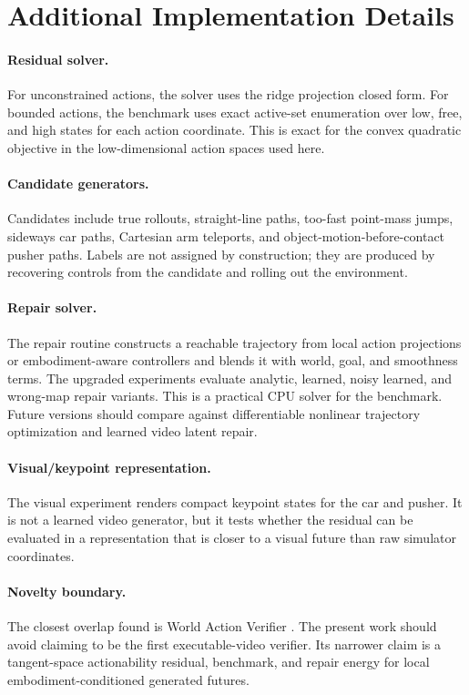 \section{Additional Implementation Details}

\paragraph{Residual solver.}
For unconstrained actions, the solver uses the ridge projection closed form. For bounded actions, the benchmark uses exact active-set enumeration over low, free, and high states for each action coordinate. This is exact for the convex quadratic objective in the low-dimensional action spaces used here.

\paragraph{Candidate generators.}
Candidates include true rollouts, straight-line paths, too-fast point-mass jumps, sideways car paths, Cartesian arm teleports, and object-motion-before-contact pusher paths. Labels are not assigned by construction; they are produced by recovering controls from the candidate and rolling out the environment.

\paragraph{Repair solver.}
The repair routine constructs a reachable trajectory from local action projections or embodiment-aware controllers and blends it with world, goal, and smoothness terms. The upgraded experiments evaluate analytic, learned, noisy learned, and wrong-map repair variants. This is a practical CPU solver for the benchmark. Future versions should compare against differentiable nonlinear trajectory optimization and learned video latent repair.

\paragraph{Visual/keypoint representation.}
The visual experiment renders compact keypoint states for the car and pusher. It is not a learned video generator, but it tests whether the residual can be evaluated in a representation that is closer to a visual future than raw simulator coordinates.

\paragraph{Novelty boundary.}
The closest overlap found is World Action Verifier \citep{liu2026wav}. The present work should avoid claiming to be the first executable-video verifier. Its narrower claim is a tangent-space actionability residual, benchmark, and repair energy for local embodiment-conditioned generated futures.
